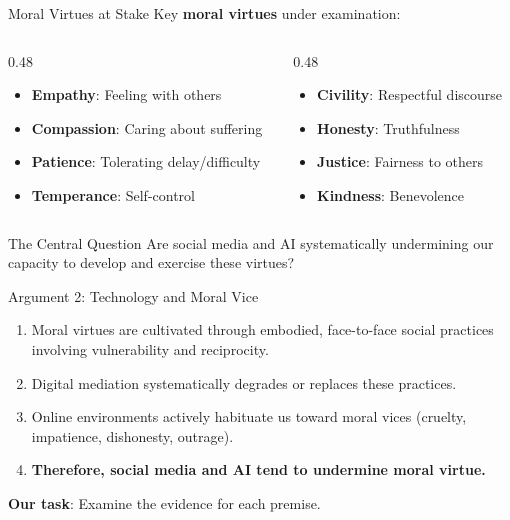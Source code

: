\documentclass[aspectratio=169]{beamer}
\begin{document}
\begin{frame}{Moral Virtues at Stake}
Key \textbf{moral virtues} under examination:

\begin{columns}[T]
\begin{column}{0.48\textwidth}
\begin{itemize}
    \item \textbf{Empathy}: Feeling with others
    \item \textbf{Compassion}: Caring about suffering
    \item \textbf{Patience}: Tolerating delay/difficulty
    \item \textbf{Temperance}: Self-control
\end{itemize}
\end{column}
\begin{column}{0.48\textwidth}
\begin{itemize}
    \item \textbf{Civility}: Respectful discourse
    \item \textbf{Honesty}: Truthfulness
    \item \textbf{Justice}: Fairness to others
    \item \textbf{Kindness}: Benevolence
\end{itemize}
\end{column}
\end{columns}

\vspace{0.5cm}
\begin{alertblock}{The Central Question}
Are social media and AI systematically undermining our capacity to develop and exercise these virtues?
\end{alertblock}
\end{frame}

\begin{frame}{Argument 2: Technology and Moral Vice}
\begin{argumentbox}
\begin{enumerate}
    \item Moral virtues are cultivated through embodied, face-to-face social practices involving vulnerability and reciprocity.
    \item Digital mediation systematically degrades or replaces these practices.
    \item Online environments actively habituate us toward moral vices (cruelty, impatience, dishonesty, outrage).
    \item[\textbf{C.}] \textbf{Therefore, social media and AI tend to undermine moral virtue.}
\end{enumerate}
\end{argumentbox}

\vspace{0.3cm}
\textbf{Our task}: Examine the evidence for each premise.
\end{frame}
\end{document}
